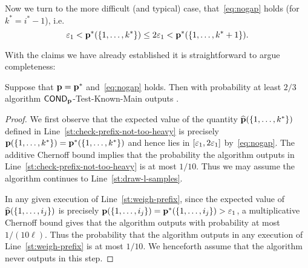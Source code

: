 Now we turn to the more difficult (and typical) case,
that~\cref{eq:nogap} holds (for $k^\ast = i^\ast -1$), i.e.
\[
{\varepsilon_1} < \mathbf{p}^\ast(\{1,\dots,k^\ast\}) \leq 2{\varepsilon_1} < \mathbf{p}^\ast(\{1,\dots,k^\ast + 1\}).
\]

With the claims we have already established it is straightforward to argue completeness:

\begin{lemma} \label{lem:CKTM-complete}
Suppose that $\mathbf{p} = \mathbf{p}^\ast$ and~\cref{eq:nogap} holds.  Then with probability at least $2/3$ algorithm {\sc ${\sf COND}_{\mathbf{p}}$-Test-Known-Main} outputs \accept.
\end{lemma}

\begin{proof}
We first observe that the expected value of the quantity $\widehat{\mathbf{p}}(\{1,\dots,k^\ast\})$ defined in Line~\ref{st:check-prefix-not-too-heavy} is precisely $\mathbf{p}(\{1,\dots,k^\ast\}) =
\mathbf{p}^\ast(\{1,\dots,k^\ast\})$ and hence lies in $[{\varepsilon_1},2{\varepsilon_1}]$
by~\cref{eq:nogap}.
The additive Chernoff bound implies that the probability the algorithm outputs \reject
in Line~\ref{st:check-prefix-not-too-heavy} is at most $1/10.$  Thus we may assume the algorithm continues to Line~\ref{st:draw-l-samples}.


In any given execution of Line~\ref{st:weigh-prefix}, since the expected value
of $\widehat{\mathbf{p}}(\{1,\dots,i_j\})$ is precisely $\mathbf{p}(\{1,\dots,i_j\})=\mathbf{p}^\ast(\{1,\dots,i_j\}) > {\varepsilon_1}$,
a multiplicative Chernoff bound gives that the algorithm outputs \reject with
probability at most $1/(10 \ell)$.  Thus the probability that the algorithm outputs \reject in any execution of Line~\ref{st:weigh-prefix} is at most $1/10$.
We henceforth assume that the algorithm never outputs \reject in this step.


\end{proof}
